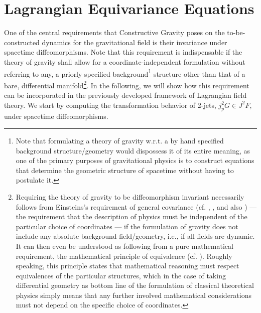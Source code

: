 \section{Lagrangian Equivariance Equations}
One of the central requirements that Constructive Gravity poses on the to-be-constructed dynamics for the gravitational field is their invariance under spacetime diffeomorphisms.
Note that this requirement is indispensable if the theory of gravity shall allow for a coordinate-independent formulation without referring to any, a priorly specified background\footnote{Note that formulating a theory of gravity w.r.t. a by hand specified background structure/geometry would dispossess it of its entire meaning, as one of the primary purposes of gravitational physics is to construct equations that determine the geometric structure of spacetime without having to postulate it.} structure other than that of a bare, differential manifold\footnote{Requiring the theory of gravity to be diffeomorphism invariant necessarily follows from Einsteins's requirement of general covariance (cf. \cite{nlab:Cov}, \cite{Stachel1993-STATMO-5}, \cite{Pooley} and also \cite{Norton1993-NORGCA}) --- the requirement that the description of physics must be independent of the particular choice of coordinates --- if the formulation of gravity does not include any absolute background field/geometry, i.e., if all fields are dynamic.
It can then even be understood as following from a pure mathematical requirement, the mathematical principle of equivalence (cf. \cite{nlab:Equi}). Roughly speaking, this principle states that mathematical reasoning  must respect equivalences of the particular structures, which in the case of taking differential geometry as bottom line of the formulation of classical theoretical physics simply means that any further involved mathematical considerations must not depend on the specific choice of coordinates.  
}. 
In the following, we will show how this requirement can be incorporated in the previously developed framework of Lagrangian field theory. We start by computing the transformation behavior of 2-jets, $j_p^2G \in J^2F$, under spacetime diffeomorphisms.

